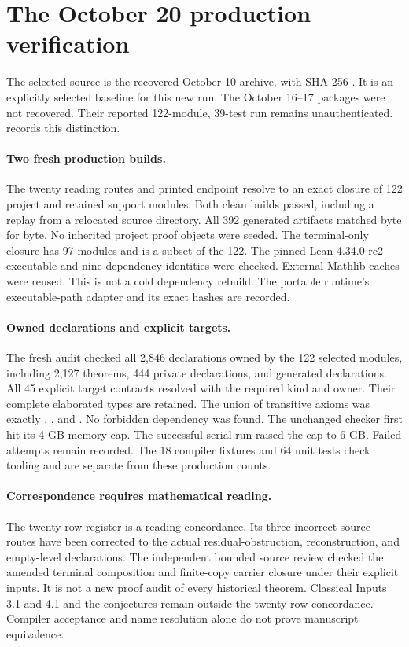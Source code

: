 \section{The October 20 production verification}
The selected source is the recovered October 10 archive, with SHA-256
.
It is an explicitly selected baseline for this new run. The October 16--17
packages were not recovered. Their reported 122-module, 39-test run remains
unauthenticated. 
records this distinction.

\paragraph{Two fresh production builds.}
The twenty reading routes and printed endpoint resolve to an exact closure of
122 project and retained support modules. Both clean builds passed, including a
replay from a relocated source directory. All 392 generated artifacts matched
byte for byte. No inherited project proof objects were seeded. The terminal-only
closure has 97 modules and is a subset of the 122.
The pinned Lean 4.34.0-rc2 executable and nine dependency identities were checked.
External Mathlib caches were reused. This is not a cold dependency rebuild.
The portable runtime's executable-path adapter and its exact hashes are recorded.

\paragraph{Owned declarations and explicit targets.}
The fresh audit checked all 2,846 declarations owned by the 122 selected modules,
including 2,127 theorems, 444 private declarations, and generated declarations.
All 45 explicit target contracts resolved with the required kind and owner.
Their complete elaborated types are retained. The union of transitive axioms was
exactly , , and .
No forbidden dependency was found. The unchanged checker first hit its 4 GB
memory cap. The successful serial run raised the cap to 6 GB. Failed attempts remain recorded.
The 18 compiler fixtures and 64 unit tests check tooling and are separate from
these production counts.

\paragraph{Correspondence requires mathematical reading.}
The twenty-row register is a reading concordance. Its three incorrect source
routes have been corrected to the actual residual-obstruction, reconstruction,
and empty-level declarations. The independent bounded source review checked
the amended terminal composition and finite-copy carrier closure under their
explicit inputs. It is not a new proof audit of every historical theorem.
Classical Inputs 3.1 and 4.1 and the conjectures remain outside the twenty-row
concordance. Compiler acceptance and name resolution alone do not prove
manuscript equivalence.

